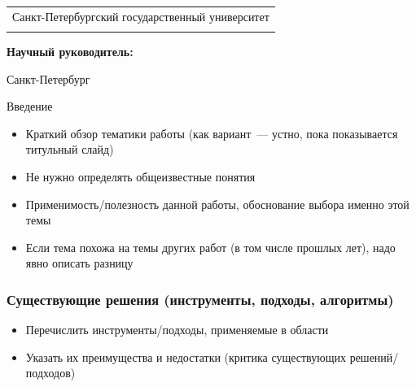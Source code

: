 \documentclass
  [ russian
  , aspectratio=1610 %
  ] {beamer}
\title[Короткое название]{\my@title@title@ru}
\author[\my@title@author@ru]{\my@title@author@ru, группа \academicGroup}
\institute[СПбГУ]{}
\date[9 сентября 2024 г.]{}
\makeatletter
\newcommand{\advisorChair}{\my@title@chair@ru}
\newcommand{\supervisor}{\my@title@supervisor@ru}
\newcommand{\supervisorPosition}{\my@title@supervisorPosition@ru}
\newcommand{\defenseYear}{\my@title@year@ru}
\makeatother
\begin{document}
{

\begin{frame}
    \vspace{15pt}
    \begin{center}
        \begin{tabular}{c}
            \scriptsize{Санкт-Петербургский государственный университет} \\
            \scriptsize{\advisorChair}
        \end{tabular}
        \titlepage
    \end{center}

    \btVFill

    {\scriptsize
        \textbf{Научный руководитель:}  \supervisorPosition~\supervisor \\
    }
    \makeatother
    \begin{center}
        \vspace{5pt}
        \scriptsize{Санкт-Петербург\\ \defenseYear}
    \end{center}
\end{frame}
}

\begin{frame}{Введение}
    \begin{itemize}
        \item Краткий обзор тематики работы (как вариант~--- устно, пока показывается титульный слайд)
        \item Не нужно определять общеизвестные понятия
        \item Применимость/полезность данной работы, обоснование выбора именно этой темы
        \item Если тема похожа на темы других работ (в том числе прошлых лет), надо явно описать разницу
    \end{itemize}
\end{frame}

\begin{frame}
    \frametitle{Существующие решения (инструменты, подходы, алгоритмы)}
    \begin{itemize}
        \item Перечислить инструменты/подходы, применяемые в области
        \item Указать их преимущества и недостатки (критика существующих решений/подходов)
    \end{itemize}

\end{frame}
\end{document}
